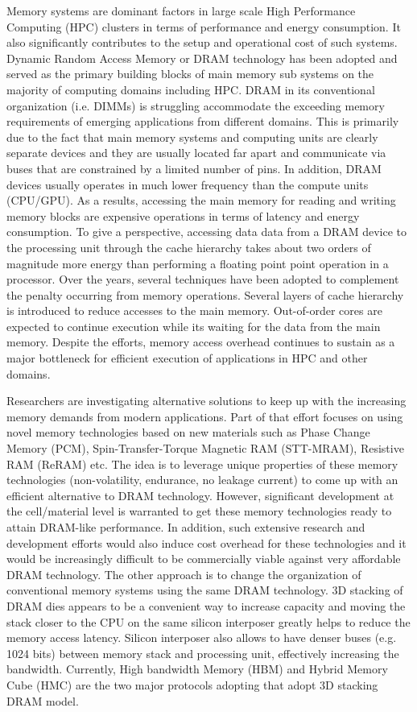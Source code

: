 Memory systems are dominant factors in large scale High Performance Computing (HPC) clusters in terms of performance and energy consumption. It also significantly contributes to the setup and operational cost of such systems. Dynamic Random Access Memory or DRAM technology has been adopted and served as the primary building blocks of main memory sub systems on the majority of computing domains including HPC. DRAM in its conventional organization (i.e. DIMMs) is struggling accommodate the exceeding memory requirements of emerging applications from different domains. This is primarily due to the fact that main memory systems and computing units are clearly separate devices and they are usually located far apart and communicate via buses that are constrained by a limited number of pins. In addition, DRAM devices usually operates in much lower frequency than the compute units (CPU/GPU). As a results, accessing the main memory for reading and writing memory blocks are expensive operations in terms of latency and energy consumption. To give a perspective, accessing data data from a DRAM device to the processing unit through the cache hierarchy takes about two orders of magnitude more energy than performing a floating point point operation in a processor. Over the years, several techniques have been adopted to complement the penalty occurring from memory operations. Several layers of cache hierarchy is introduced to reduce accesses to the main memory. Out-of-order cores are expected to continue execution while its waiting for the data from the main memory. Despite the efforts, memory access overhead continues to sustain as a major bottleneck for efficient execution of applications in HPC and other domains.

Researchers are investigating alternative solutions to keep up with the increasing memory demands from modern applications. Part of that effort focuses on using novel memory technologies based on new materials such as Phase Change Memory (PCM), Spin-Transfer-Torque Magnetic RAM (STT-MRAM), Resistive RAM (ReRAM) etc. The idea is to leverage unique properties of these memory technologies (non-volatility, endurance, no leakage current) to come up with an efficient alternative to DRAM technology. However, significant development at the cell/material level is warranted to get these memory technologies ready to attain DRAM-like performance. In addition, such extensive research and development efforts would also induce cost overhead for these technologies and it would be increasingly difficult to be commercially viable against very affordable DRAM technology.   
The other approach is to change the organization of conventional memory systems using the same DRAM technology. 3D stacking of DRAM dies appears to be a convenient way to increase capacity and moving the stack closer to the CPU on the same silicon interposer greatly helps to reduce the memory access latency. Silicon interposer also allows to have denser buses (e.g. 1024 bits) between memory stack and processing unit, effectively increasing the bandwidth. Currently, High bandwidth Memory (HBM) and Hybrid Memory Cube (HMC) are the two major protocols adopting that adopt 3D stacking DRAM model.        

